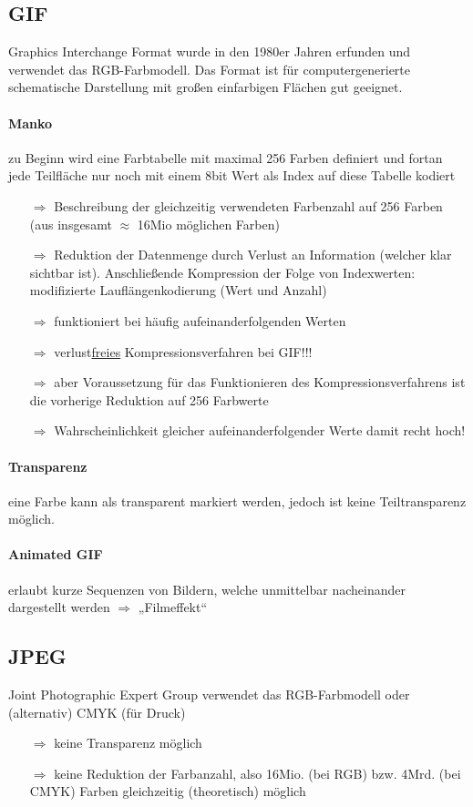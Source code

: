 \subsection{GIF}
Graphics Interchange Format wurde in den 1980er Jahren erfunden und verwendet das RGB-Farbmodell. Das Format ist für computergenerierte schematische Darstellung mit großen einfarbigen Flächen gut geeignet.
\paragraph{Manko}zu Beginn wird eine Farbtabelle mit maximal 256 Farben definiert und fortan jede Teilfläche nur noch mit einem 8bit Wert als Index auf diese Tabelle kodiert
\begin{itemize}
\item[$\Rightarrow$]Beschreibung der gleichzeitig verwendeten Farbenzahl auf 256 Farben (aus insgesamt $\approx$ 16Mio möglichen Farben)
\item[$\Rightarrow$]Reduktion der Datenmenge durch Verlust an Information (welcher klar sichtbar ist). Anschließende Kompression der Folge von Indexwerten: modifizierte Lauflängenkodierung (Wert und Anzahl)
\item[$\Rightarrow$]funktioniert bei häufig aufeinanderfolgenden Werten
\item[$\Rightarrow$]verlust\underline{freies} Kompressionsverfahren bei GIF!!!
\item[$\Rightarrow$]aber Voraussetzung für das Funktionieren des Kompressionsverfahrens ist die vorherige Reduktion auf 256 Farbwerte
\item[$\Rightarrow$]Wahrscheinlichkeit gleicher aufeinanderfolgender Werte damit recht hoch!
\end{itemize}
\paragraph{Transparenz} eine Farbe kann als transparent markiert werden, jedoch ist keine Teiltransparenz möglich.
\paragraph{Animated GIF}erlaubt kurze Sequenzen von Bildern, welche unmittelbar nacheinander dargestellt werden $\Rightarrow$ „Filmeffekt“

\subsection{JPEG}
Joint Photographic Expert Group verwendet das RGB-Farbmodell oder (alternativ) CMYK (für Druck)
\begin{itemize}
\item[$\Rightarrow$]keine Transparenz möglich
\item[$\Rightarrow$]keine Reduktion der Farbanzahl, also 16Mio. (bei RGB) bzw. 4Mrd. (bei CMYK) Farben gleichzeitig (theoretisch) möglich
\end{itemize}
\newpage
